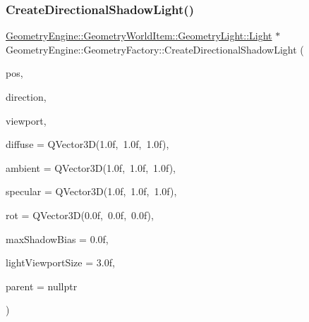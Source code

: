 \subsubsection{\texorpdfstring{CreateDirectionalShadowLight()}{CreateDirectionalShadowLight()}\hspace{0.1cm}{\footnotesize\ttfamily [1/2]}}
{\footnotesize\ttfamily \mbox{\hyperlink{class_geometry_engine_1_1_geometry_world_item_1_1_geometry_light_1_1_light}{Geometry\+Engine\+::\+Geometry\+World\+Item\+::\+Geometry\+Light\+::\+Light}} $\ast$ Geometry\+Engine\+::\+Geometry\+Factory\+::\+Create\+Directional\+Shadow\+Light (\begin{DoxyParamCaption}\item[{const Q\+Vector3D \&}]{pos,  }\item[{const Q\+Vector3D \&}]{direction,  }\item[{const \mbox{\hyperlink{class_geometry_engine_1_1_geometry_item_utils_1_1_viewport}{Geometry\+Item\+Utils\+::\+Viewport}} \&}]{viewport,  }\item[{const Q\+Vector3D \&}]{diffuse = {\ttfamily QVector3D(1.0f,~1.0f,~1.0f)},  }\item[{const Q\+Vector3D \&}]{ambient = {\ttfamily QVector3D(1.0f,~1.0f,~1.0f)},  }\item[{const Q\+Vector3D \&}]{specular = {\ttfamily QVector3D(1.0f,~1.0f,~1.0f)},  }\item[{const Q\+Vector3D \&}]{rot = {\ttfamily QVector3D(0.0f,~0.0f,~0.0f)},  }\item[{float}]{max\+Shadow\+Bias = {\ttfamily 0.0f},  }\item[{float}]{light\+Viewport\+Size = {\ttfamily 3.0f},  }\item[{\mbox{\hyperlink{class_geometry_engine_1_1_geometry_world_item_1_1_world_item}{Geometry\+World\+Item\+::\+World\+Item}} $\ast$}]{parent = {\ttfamily nullptr} }\end{DoxyParamCaption})\hspace{0.3cm}{\ttfamily [static]}}

